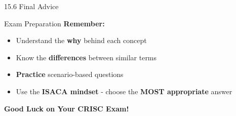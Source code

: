 \documentclass{beamer}
\begin{document}
	\begin{frame}{15.6 Final Advice}
		\begin{block}{Exam Preparation}
			\centering
			\vspace{0.3cm}
			\textbf{Remember:}
			\begin{itemize}
				\item Understand the \textbf{why} behind each concept
				\item Know the \textbf{differences} between similar terms
				\item \textbf{Practice} scenario-based questions
				\item Use the \textbf{ISACA mindset} - choose the \textbf{MOST appropriate} answer
			\end{itemize}
			\vspace{0.5cm}
			\Large{\textbf{Good Luck on Your CRISC Exam!}}
		\end{block}
	\end{frame}
	
	
\end{document}
